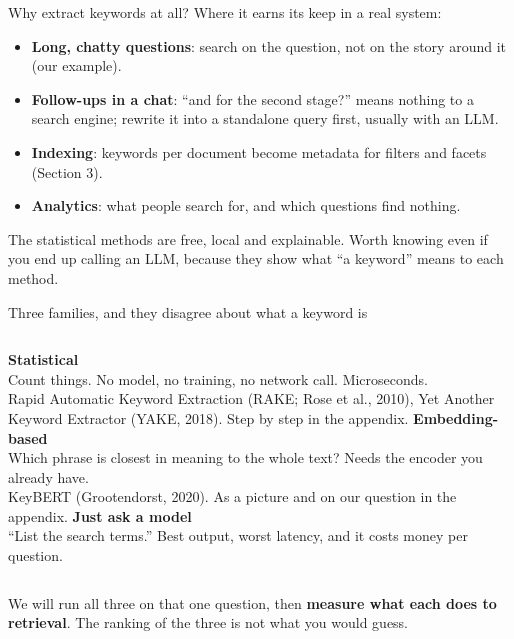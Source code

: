 \documentclass[aspectratio=169]{beamer}
\newcommand{\takebox}[1]{%
  \begin{tcolorbox}[colback=paramgreen!8, colframe=paramgreen, boxrule=0.6pt, arc=2pt]
  #1
  \end{tcolorbox}}
\begin{document}
\begin{frame}{Why extract keywords at all?}
  \vspace{0.5em}
  Where it earns its keep in a real system:

  \vspace{0.5em}
  \begin{itemize}
    \item \textbf{Long, chatty questions}: search on the question, not on the story around it (our example).
    \item \textbf{Follow-ups in a chat}: ``and for the second stage?'' means nothing to a search engine; rewrite it
      into a standalone query first, usually with an LLM.
    \item \textbf{Indexing}: keywords per document become metadata for filters and facets (Section 3).
    \item \textbf{Analytics}: what people search for, and which questions find nothing.
  \end{itemize}

  \vspace{0.6em}
  \takebox{The statistical methods are free, local and explainable. Worth knowing even if you end up calling an
  LLM, because they show what ``a keyword'' means to each method.}
\end{frame}

\begin{frame}{Three families, and they disagree about what a keyword is}
  \vspace{0.3em}
  \begin{columns}[T]
      \textbf{\color{armorange}Statistical}\\[0.4em]
      {\small Count things. No model, no training, no network call. Microseconds.}\\[0.5em]
      {\small Rapid Automatic Keyword Extraction (RAKE; Rose et al., 2010), Yet Another Keyword Extractor
      (YAKE, 2018). Step by step in the appendix.}
      \textbf{\color{armblue}Embedding-based}\\[0.4em]
      {\small Which phrase is closest in meaning to the whole text? Needs the encoder you
      already have.}\\[0.5em]
      {\small KeyBERT (Grootendorst, 2020). As a picture and on our question in the appendix.}
      \textbf{\color{armred}Just ask a model}\\[0.4em]
      {\small ``List the search terms.'' Best output, worst latency, and it costs money per
      question.}
  \end{columns}

  \vspace{0.5em}
  \takebox{We will run all three on that one question, then \textbf{measure what each does
  to retrieval}. The ranking of the three is not what you would guess.}
\end{frame}
\end{document}
